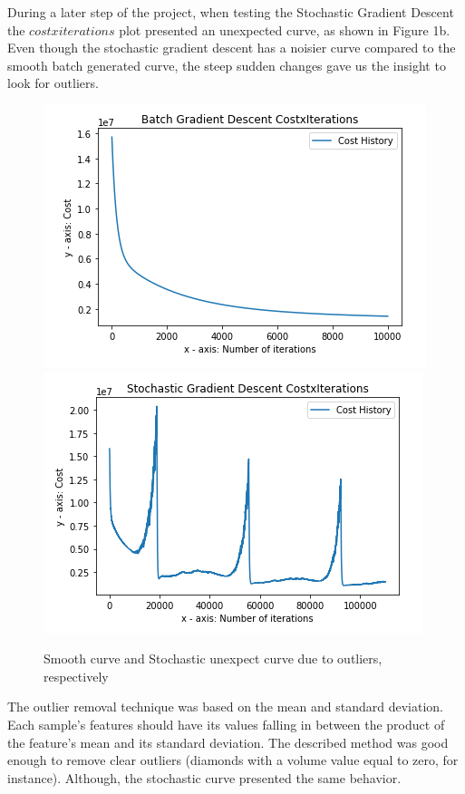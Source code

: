 \documentclass[conference]{IEEEtran}
\begin{document}
    During a later step of the project, when testing the Stochastic Gradient Descent the $cost x iterations$ plot presented an unexpected curve, as shown in Figure 1b. Even though the stochastic gradient descent has a noisier curve compared to the smooth batch generated curve, the steep sudden changes gave us the insight to look for outliers.
	
	\begin{figure}[!h]
      \centering
      \includegraphics[scale=0.28]{images/smooth-gd-curve.png}
      \includegraphics[scale=0.28]{images/steep-curves-in-stochastic-gd.png}
      \caption{Smooth curve and Stochastic unexpect curve due to outliers, respectively}
      \label{fig1}
  \end{figure}
	
    The outlier removal technique was based on the mean and standard deviation. Each sample's features should have its values falling in between the product of the feature's mean and its standard deviation. The described method was good enough to remove clear outliers (diamonds with a volume value equal to zero, for instance). Although, the stochastic curve presented the same behavior.
    
\end{document}
